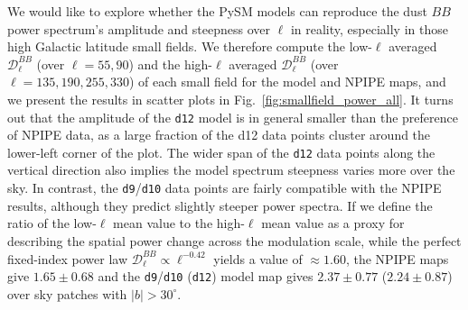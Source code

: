 \documentclass[twocolumn]{aastex631}
\begin{document}
We would like to explore whether the PySM models can reproduce the dust $BB$ power spectrum's amplitude and steepness over $\ell$ in reality, especially in those high Galactic latitude small fields. We therefore compute the low-$\ell$ averaged $\mathcal{D}_\ell^{BB}$ (over $\ell = 55, 90$) and the high-$\ell$ averaged $\mathcal{D}_\ell^{BB}$ (over $\ell = 135, 190, 255, 330$) of each small field for the model and NPIPE maps, and we present the results in scatter plots in Fig.~\ref{fig:smallfield_power_all}. It turns out that the amplitude of the \texttt{d12} model is in general smaller than the preference of NPIPE data, as a large fraction of the d12 data points cluster around the lower-left corner of the plot. The wider span of the \texttt{d12} data points along the vertical direction also implies the model spectrum steepness varies more over the sky. In contrast, the \texttt{d9}/\texttt{d10} data points are fairly compatible with the NPIPE results, although they predict slightly steeper power spectra. If we define the ratio of the low-$\ell$ mean value to the high-$\ell$ mean value as a proxy for describing the spatial power change across the modulation scale, while the perfect fixed-index power law $\mathcal{D}_\ell^{BB} \propto \ell^{-0.42}$ yields a value of $\approx 1.60$, the NPIPE maps give $1.65 \pm 0.68$ and the \texttt{d9}/\texttt{d10} (\texttt{d12}) model map gives $2.37 \pm 0.77$ ($2.24 \pm 0.87$) over sky patches with $|b| > 30^\circ$.
\end{document}
